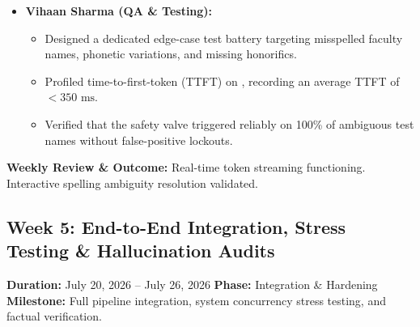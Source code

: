 \documentclass[11pt,a4paper]{article}
\begin{document}
\begin{itemize}
    \item \textbf{Vihaan Sharma (QA \& Testing):}
    \begin{itemize}
        \setlength{\itemsep}{0pt}
        \item Designed a dedicated edge-case test battery targeting misspelled faculty names, phonetic variations, and missing honorifics.
        \item Profiled time-to-first-token (TTFT) on , recording an average TTFT of $<350\text{ ms}$.
        \item Verified that the safety valve triggered reliably on 100\% of ambiguous test names without false-positive lockouts.
    \end{itemize}
\end{itemize}
\noindent \textbf{Weekly Review \& Outcome:} Real-time token streaming functioning. Interactive spelling ambiguity resolution validated.

\newpage
\subsection*{Week 5: End-to-End Integration, Stress Testing \& Hallucination Audits}
\noindent \textbf{Duration:} July 20, 2026 -- July 26, 2026 \hfill \textbf{Phase:} Integration \& Hardening \\
\textbf{Milestone:} Full pipeline integration, system concurrency stress testing, and factual verification.
\end{document}
